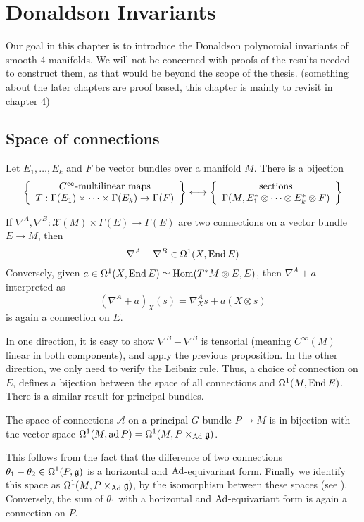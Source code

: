 
\chapter{Donaldson Invariants}
\label{chapter1}
Our goal in this chapter is to introduce the Donaldson polynomial invariants of
smooth 4-manifolds. We will not be concerned with proofs of the results needed
to construct them, as that would be beyond the scope of the thesis. 
(something about the later chapters are proof based, this chapter is mainly to
revisit in chapter 4)

\section{Space of connections}
\begin{prop}
	Let $E_1,\ldots,E_k$ and $F$ be vector bundles over a manifold  $M$. 
	There is a bijection
	\[
	\set{
		\begin{array}{c}
			C^\infty\text{-multilinear maps} \\
			T:\Gamma(E_1)\times \cdots \times \Gamma(E_k) \to \Gamma(F)
		\end{array}
	} \longleftrightarrow
	\set{
		\begin{array}{c}
			\text{sections}\\
			  \Gamma(M,E_1^*\otimes \cdots \otimes E_k^*\otimes F)
		
		\end{array}
	}
	\] 
\end{prop}
\begin{prop}
	If $\nabla^A,\nabla^B : \mathcal{X}(M) \times \Gamma(E) \to \Gamma(E)$ are
	two connections on a vector bundle $E\to M$, then 
	 \[
	\nabla^A - \nabla^B \in \Omega^1(X,\operatorname{End} E)
	\] 
	Conversely, given $a\in \Omega^1(X,\operatorname{End} E) \simeq \operatorname{Hom}(T^*M\otimes E,E)$, 
	then $\nabla^A+a$ interpreted as 
	\[
		(\nabla^A + a)_X(s) = \nabla^A_X s + a(X\otimes s)
	\] 
	is again a connection on  $E$. 
\end{prop}
In one direction, it is easy to show $\nabla^B-\nabla^B$ is tensorial (meaning
$C^\infty(M)$ linear in both components), and apply the previous proposition. In the other
direction, we only need to verify the Leibniz rule. Thus, a choice of connection
on $E$, defines a bijection between the space of all connections and
$\Omega^1(M,\operatorname{End} E)$. There is a similar result for principal bundles.

\begin{prop} %
	The space of connections $\mathcal{A}$ on a principal $G$-bundle $P\to M$ is in bijection 
	with the vector space $\Omega^1(M,\operatorname{ad} P) = \Omega^1(M,P\times_{\operatorname{Ad}} \mathfrak{g})$.
\end{prop}
This follows from the fact that the difference of two connections
$\theta_1-\theta_2\in \Omega^1(P,\operatorname{\mathfrak{g}})$ is a horizontal and $\operatorname{Ad}$-equivariant form.
Finally we identify this space as $\Omega^1(M,P\times_{\operatorname{Ad}}\operatorname{\mathfrak{g}})$, by 
the isomorphism between these spaces (see \cite[Theorem 31.9]{loringtu}). 
Conversely, the sum of $\theta_1$ with 
a horizontal and $\operatorname{Ad}$-equivariant form is again a connection on  $P$.

